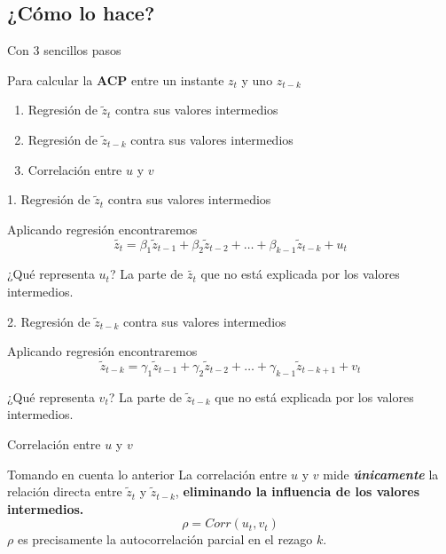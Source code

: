 \documentclass[11pt]{beamer}
\begin{document}
\subsection{¿Cómo lo hace?}
\begin{frame}{Con 3 sencillos pasos}
\begin{block}{Para calcular la \textbf{ACP} entre un instante $z_t$ y uno $z_{t-k}$ }
\begin{enumerate}
	\item Regresión de $\tilde{z}_t$ contra sus valores intermedios
	\item Regresión de $\tilde{z}_{t-k}$ contra sus valores intermedios
	\item Correlación entre $u$ y $v$
\end{enumerate}
\end{block}
\end{frame}

\begin{frame}{1. Regresión de $\tilde{z}_t$ contra sus valores intermedios}
\begin{block}{Aplicando regresión encontraremos}
$$ \tilde{z_t}  = \beta_1 \tilde{z}_{t-1} + \beta_2 \tilde{z}_{t-2} + \dots + \beta_{k-1} \tilde{z}_{t-k} + u_t $$
\end{block}
\begin{block}{¿Qué representa $u_t$?}
	La parte de $\tilde{z_t}$ que no está explicada por los valores intermedios.
\end{block}
\end{frame}

\begin{frame}{2. Regresión de $\tilde{z}_{t-k}$ contra sus valores intermedios}
\begin{block}{Aplicando regresión encontraremos}
$$ \tilde{z}_{t-k}  = \gamma_1 \tilde{z}_{t-1} + \gamma_2 \tilde{z}_{t-2} + \dots + \gamma_{k-1} \tilde{z}_{t-k+1} + v_t $$
\end{block}
\begin{block}{¿Qué representa $v_t$?}
	La parte de $\tilde{z}_{t-k}$ que no está explicada por los valores intermedios.
\end{block}
\end{frame}

\begin{frame}{Correlación entre $u$ y $v$}
\begin{block}{Tomando en cuenta lo anterior}
La correlación entre $u$ y $v$ mide \textbf{\textit{únicamente}} la relación directa entre $\tilde{z}_t$ y $\tilde{z}_{t-k}$, \textbf{eliminando la influencia de los valores intermedios.}
\begin{equation}
	\rho = Corr(u_t,v_t)
\end{equation}
$\rho$ es precisamente la autocorrelación parcial en el rezago $k$.
\end{block}
\end{frame}
\end{document}
